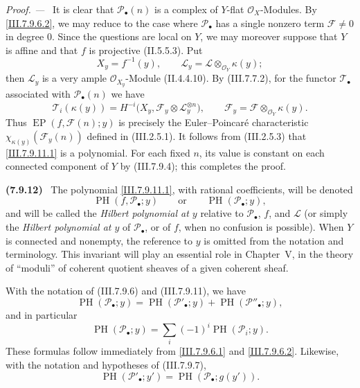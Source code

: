 \documentclass[10pt,oneside]{book}
\newcommand{\sh}[1]{\mathscr{#1}}
\newcommand{\kres}{\kappa}
\newcommand{\sref}[2][]{(#2)}
\newenvironment{env}[1][]{\par\medskip\noindent\textbf{(#1)}\ }{\par}
\newenvironment{proof}{\par\medskip\noindent\textit{Proof. ---\ }}{\par}
\begin{document}
\begin{proof}
It is clear that $\sh{P}_\bullet(n)$ is a complex of
$Y$-flat $\sh{O}_X$-Modules.  By
\eqref{III.7.9.6.2}, we may reduce to the case where
$\sh{P}_\bullet$ has a single nonzero term
$\sh{F}\neq0$ in degree $0$.  Since the questions are
local on $Y$, we may moreover suppose that $Y$ is affine
and that $f$ is projective \sref[II]{II.5.5.3}.  Put
\[
  X_y=f^{-1}(y),\qquad
  \sh{L}_y=\sh{L}\otimes_{\sh{O}_Y}\kres(y);
\]
then $\sh{L}_y$ is a very ample $\sh{O}_{X_y}$-Module
\sref[II]{II.4.4.10}.  By \sref{III.7.7.2}, for the
functor $\sh{T}_\bullet$ associated with
$\sh{P}_\bullet(n)$ we have
\[
  \sh{T}_i(\kres(y))
  =
  H^{-i}\bigl(
    X_y,\sh{F}_y\otimes\sh{L}_y^{\otimes n}\bigr),
  \qquad
  \sh{F}_y=\sh{F}\otimes_{\sh{O}_Y}\kres(y).
\]
Thus $\operatorname{EP}(f,\sh{F}(n);y)$ is precisely the
Euler--Poincar\'e characteristic
$\chi_{\kres(y)}(\sh{F}_y(n))$ defined in
\sref{III.2.5.1}.  It follows from \sref{III.2.5.3} that
\eqref{III.7.9.11.1} is a polynomial.  For each fixed
$n$, its value is constant on each connected component of
$Y$ by \sref{III.7.9.4}; this completes the proof.
\end{proof}

\begin{env}[7.9.12]
\label{III.7.9.12}
The polynomial \eqref{III.7.9.11.1}, with rational
coefficients, will be denoted
\[
  \operatorname{PH}(f,\sh{P}_\bullet;y)
  \qquad\text{or}\qquad
  \operatorname{PH}(\sh{P}_\bullet;y),
\]
and will be called the \emph{Hilbert polynomial at $y$}
relative to $\sh{P}_\bullet$, $f$, and $\sh{L}$ (or simply
the \emph{Hilbert polynomial at $y$} of
$\sh{P}_\bullet$, or of $f$, when no confusion is
possible).  When $Y$ is connected and nonempty, the
reference to $y$ is omitted from the notation and
terminology.  This invariant will play an essential role
in Chapter~V, in the theory of ``moduli'' of coherent
quotient sheaves of a given coherent sheaf.

With the notation of \sref{III.7.9.6} and
\sref{III.7.9.11}, we have
\[
  \operatorname{PH}(\sh{P}_\bullet;y)
  =
  \operatorname{PH}(\sh{P}'_\bullet;y)
  +
  \operatorname{PH}(\sh{P}''_\bullet;y),
  \tag{7.9.12.1}\label{III.7.9.12.1}
\]
and in particular
\[
  \operatorname{PH}(\sh{P}_\bullet;y)
  =
  \sum_i(-1)^i\operatorname{PH}(\sh{P}_i;y).
  \tag{7.9.12.2}\label{III.7.9.12.2}
\]
These formulas follow immediately from
\eqref{III.7.9.6.1} and \eqref{III.7.9.6.2}.  Likewise,
with the notation and hypotheses of \sref{III.7.9.7},
\[
  \operatorname{PH}(\sh{P}'_\bullet;y')
  =
  \operatorname{PH}(\sh{P}_\bullet;g(y')).
  \tag{7.9.12.3}\label{III.7.9.12.3}
\]
\end{env}
\end{document}
